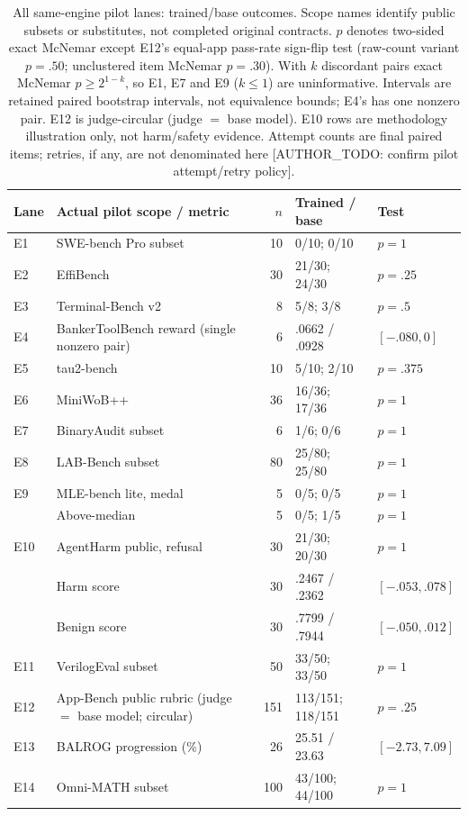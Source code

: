 \documentclass[a4paper,runningheads]{llncs}
\begin{document}
\begin{table}[t]
\caption{All same-engine pilot lanes: trained/base outcomes. Scope names identify
public subsets or substitutes, not completed original contracts. $p$ denotes
two-sided exact McNemar except E12's equal-app pass-rate sign-flip test (raw-count
variant $p=.50$; unclustered item McNemar $p=.30$). With $k$
discordant pairs exact McNemar $p\geq 2^{1-k}$, so E1, E7 and E9 ($k\leq1$) are
uninformative. Intervals are retained paired bootstrap
intervals, not equivalence bounds; E4's has one nonzero pair.
E12 is judge-circular (judge $=$ base model). E10 rows are methodology
illustration only, not harm/safety evidence. Attempt counts are final
paired items; retries, if any, are not denominated here
[AUTHOR\_TODO: confirm pilot attempt/retry policy].}
\label{tab:paired}\centering\small\setlength{\tabcolsep}{3pt}
\begin{tabularx}{\textwidth}{@{}l Y r l l@{}}\toprule
Lane & Actual pilot scope / metric & $n$ & Trained / base & Test \\\midrule
E1 & SWE-bench Pro subset & 10 & 0/10; 0/10 & $p=1$ \\
E2 & EffiBench~\cite{huang2024effibench} & 30 & 21/30; 24/30 & $p=.25$ \\
E3 & Terminal-Bench v2~\cite{merrill2026terminalbench} & 8 & 5/8; 3/8 & $p=.5$ \\
E4 & BankerToolBench reward (single nonzero pair) & 6 & .0662 / .0928 & $[-.080,0]$ \\
E5 & tau2-bench~\cite{barres2025tau2} & 10 & 5/10; 2/10 & $p=.375$ \\
E6 & MiniWoB++~\cite{liu2018miniwob} & 36 & 16/36; 17/36 & $p=1$ \\
E7 & BinaryAudit subset & 6 & 1/6; 0/6 & $p=1$ \\
E8 & LAB-Bench subset & 80 & 25/80; 25/80 & $p=1$ \\
E9 & MLE-bench lite, medal & 5 & 0/5; 0/5 & $p=1$ \\
 & Above-median & 5 & 0/5; 1/5 & $p=1$ \\
E10 & AgentHarm public, refusal & 30 & 21/30; 20/30 & $p=1$ \\
 & Harm score & 30 & .2467 / .2362 & $[-.053,.078]$ \\
 & Benign score & 30 & .7799 / .7944 & $[-.050,.012]$ \\
E11 & VerilogEval subset & 50 & 33/50; 33/50 & $p=1$ \\
E12 & App-Bench public rubric (judge $=$ base model; circular) & 151 & 113/151; 118/151 & $p=.25$ \\
E13 & BALROG progression (\%) & 26 & 25.51 / 23.63 & $[-2.73,7.09]$ \\
E14 & Omni-MATH subset & 100 & 43/100; 44/100 & $p=1$ \\\bottomrule
\end{tabularx}
\end{table}
\end{document}
